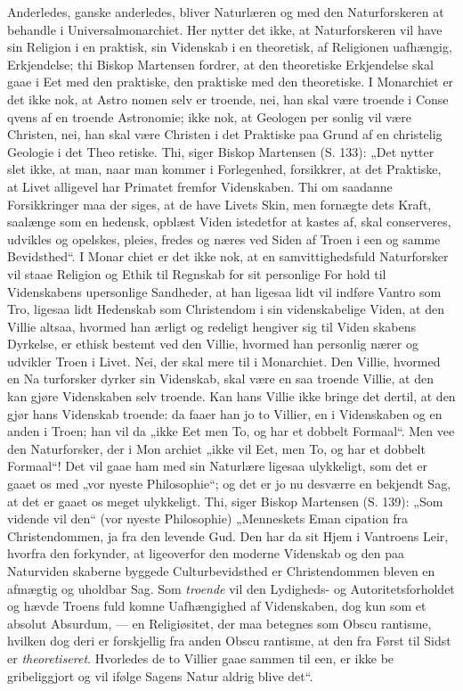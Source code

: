 \documentclass[12pt]{book}
\newcommand{\opage}[1]{\marginnote{\footnotesize\textit{[#1]}}}
\begin{document}
Anderledes, ganske anderledes, bliver Naturlæren og med
den Naturforskeren at behandle i Universalmonarchiet. Her
nytter det ikke, at Naturforskeren vil have sin Religion i en
praktisk, sin Videnskab i en theoretisk, af Religionen uafhængig,
Erkjendelse; thi Biskop Martensen fordrer, at den theoretiske
\opage{37}\setcounter{footnote}{0}%
Erkjendelse skal gaae i Eet med den praktiske, den praktiske
med den theoretiske. I Monarchiet er det ikke nok, at Astro\-%
nomen selv er troende, nei, han skal være troende i Conse\-%
qvens af en troende Astronomie; ikke nok, at Geologen per\-%
sonlig vil være Christen, nei, han skal være Christen i det
Praktiske paa Grund af en christelig Geologie i det Theo\-%
retiske. Thi, siger Biskop Martensen (S. 133): „Det nytter
slet ikke, at man, naar man kommer i Forlegenhed, forsikkrer,
at det Praktiske, at Livet alligevel har Primatet fremfor
Videnskaben. Thi om saadanne Forsikkringer maa der siges,
at de have Livets Skin, men fornægte dets Kraft, saalænge
som en hedensk, opblæst Viden istedetfor at kastes af, skal
conserveres, udvikles og opelskes, pleies, fredes og næres ved
Siden af Troen i een og samme Bevidsthed“. I Monar\-%
chiet er det ikke nok, at en samvittighedsfuld Naturforsker vil
staae Religion og Ethik til Regnskab for sit personlige For\-%
hold til Videnskabens upersonlige Sandheder, at han ligesaa
lidt vil indføre Vantro som Tro, ligesaa lidt Hedenskab
som Christendom i sin videnskabelige Viden, at den Villie
altsaa, hvormed han ærligt og redeligt hengiver sig til Viden\-%
skabens Dyrkelse, er ethisk bestemt ved den Villie, hvormed
han personlig nærer og udvikler Troen i Livet. Nei, der
skal mere til i Monarchiet. Den Villie, hvormed en Na\-%
turforsker dyrker sin Videnskab, skal være en saa troende
Villie, at den kan gjøre Videnskaben selv troende. Kan hans
Villie ikke bringe det dertil, at den gjør hans Videnskab
troende: da faaer han jo to Villier, en i Videnskaben og en
anden i Troen; han vil da „ikke Eet men To, og har et
dobbelt Formaal“. Men vee den Naturforsker, der i Mon\-%
archiet „ikke vil Eet, men To, og har et dobbelt Formaal“!
Det vil gaae ham med sin Naturlære ligesaa ulykkeligt, som
det er gaaet os med „vor nyeste Philosophie“; og det er jo
nu desværre en bekjendt Sag, at det er gaaet os meget
ulykkeligt. Thi, siger Biskop Martensen (S. 139): „Som
\opage{38}\setcounter{footnote}{0}%
vidende vil den“ (vor nyeste Philosophie) „Menneskets Eman\-%
cipation fra Christendommen, ja fra den levende Gud. Den
har da sit Hjem i Vantroens Leir, hvorfra den forkynder, at
ligeoverfor den moderne Videnskab og den paa Naturviden\-%
skaberne byggede Culturbevidsthed er Christendommen bleven
en afmægtig og uholdbar Sag. Som \emph{troende} vil den
Lydigheds- og Autoritetsforholdet og hævde Troens fuld\-%
komne Uafhængighed af Videnskaben, dog kun som et absolut
Absurdum, --- en Religiøsitet, der maa betegnes som Obscu\-%
rantisme, hvilken dog deri er forskjellig fra anden Obscu\-%
rantisme, at den fra Først til Sidst er \emph{theoretiseret}.
Hvorledes de to Villier gaae sammen til een, er ikke be\-%
gribeliggjort og vil ifølge Sagens Natur aldrig blive det“.
\end{document}
